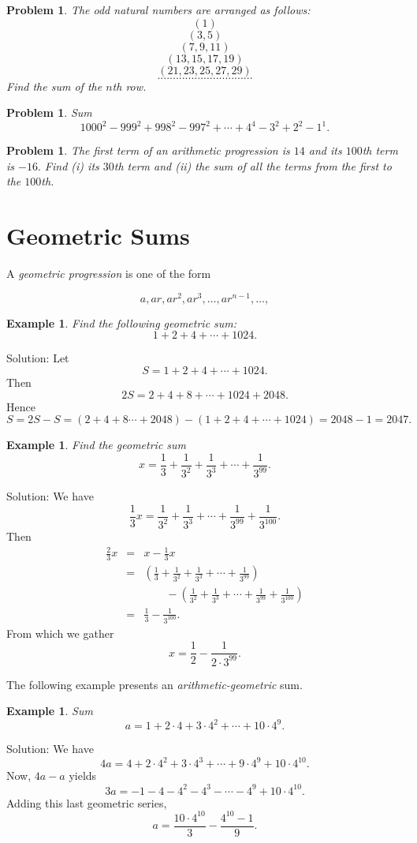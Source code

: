 \documentclass[11pt, openany]{book}
\theoremstyle{change} \theoremheaderfont{\blue\sffamily\bfseries}
\newtheorem{exa}[thm]{Example}
\newtheorem{pro}[thm]{Problem}
\theoremstyle{nonumberplain} \theoremheaderfont{\sffamily\bfseries}
\newcommand{\í}{\'{\i}}
\begin{document}
\begin{multicols}{2}
\begin{pro} The odd natural numbers are arranged as follows:
$$(1)$$
$$(3, 5)$$
$$(7, 9, 11)$$
$$(13, 15, 17, 19)$$
$$(21, 23, 25, 27, 29) $$
$$ ...............................$$
Find the sum of the $n$th row.  \end{pro}
\begin{pro}
Sum
$$1000^2 - 999^2 + 998^2 - 997^2 + \cdots + 4^4 - 3^2 + 2^2 - 1^1.$$
\end{pro}
\begin{pro}
The first term of an arithmetic progression is $14$ and its
$100$th term is $-16.$ Find (i) its $30$th term and (ii) the sum
of all the terms from the first to the $100$th.
\end{pro}
\end{multicols}
\section{Geometric Sums} A {\em geometric
progression} is one of the form

$$a, ar, ar^2, ar^3, \ldots, ar^{n - 1}, \ldots, $$

\begin{exa} Find the following geometric sum:
$$ 1 + 2 + 4 + \cdots + 1024.$$\end{exa}
Solution: Let
$$S = 1 + 2 + 4 + \cdots + 1024.$$ Then
$$2S = 2 + 4 + 8 + \cdots + 1024 + 2048.$$Hence
$$S = 2S - S = (2 + 4 + 8 \cdots + 2048) - (1 + 2 + 4 + \cdots + 1024) = 2048 - 1 = 2047.$$

\begin{exa}  Find the geometric sum
$$x = \frac{1}{3} + \frac{1}{3^2} + \frac{1}{3^3} + \cdots + \frac{1}{3^{99}}.$$\end{exa}
Solution: We have
$$ \frac{1}{3}x = \frac{1}{3^2} + \frac{1}{3^3} + \cdots + \frac{1}{3^{99}} + \frac{1}{3^{100}}.$$
Then
$$\begin{array}{lcl}
\frac{2}{3}x & = & x - \frac{1}{3}x \\
& = & (\frac{1}{3} + \frac{1}{3^2} + \frac{1}{3^3} + \cdots + \frac{1}{3^{99}}) \\
&  & \qquad  - (\frac{1}{3^2} + \frac{1}{3^3} + \cdots + \frac{1}{3^{99}} + \frac{1}{3^{100}}) \\
& = & \frac{1}{3} - \frac{1}{3^{100}}.\end{array}$$From which we
gather
$$ x = \frac{1}{2} - \frac{1}{2\cdot 3^{99}}.$$

The following example presents an {\em arithmetic-geometric} sum.
\begin{exa} Sum $$a = 1 + 2\cdot 4 + 3\cdot 4^2 + \cdots + 10\cdot 4^{9}.$$  \end{exa}
Solution: We have
$$
4a  =  4  +  2\cdot 4^2  +  3\cdot 4^3  +  \cdots +  9\cdot 4^9 +
10\cdot 4^{10}. $$ Now, $4a - a$ yields
$$3a  =  - 1  - 4  - 4^2  - 4^3  -  \cdots  - 4^9 +  10\cdot 4^{10}. $$
Adding this last geometric series,
$$a = \frac{10\cdot 4^{10}}{3} - \frac{4^{10} - 1}{9}.$$
\end{document}

